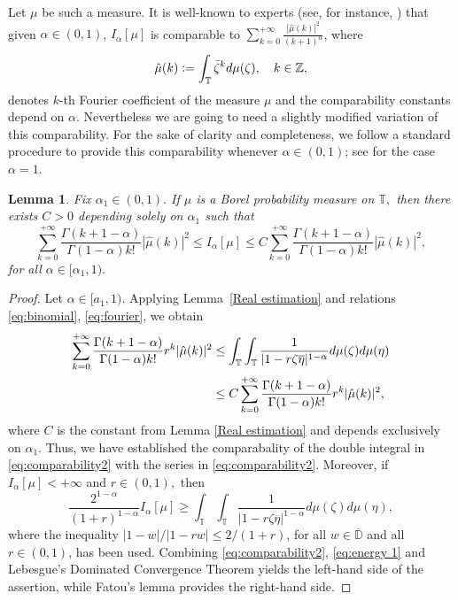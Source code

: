 \documentclass[12pt]{amsart}
\newtheorem{lemma}[theorem]{Lemma}
\theoremstyle{definition}\newtheorem{remark}[theorem]{Remark}
\theoremstyle{definition}\newtheorem{example}[theorem]{Example}
\theoremstyle{definition}\newtheorem{definition}{Definition}
\numberwithin{equation}{section}
\newcommand\DD{{\mathbb D}}
\newcommand\TT{{\mathbb T}}
\begin{document}
Let $\mu$ be such a measure. It is well-known to experts (see, for instance, \cite[p. 566]{EFKR}) that given $\alpha\in(0,1)$, $I_\alpha[\mu]$ is comparable to $\sum_{k=0}^{+\infty}\frac{|\hat{\mu}(k)|^2}{(k+1)^\alpha}$, where
\begin{equation}\label{eq:fourier}
    \hat{\mu}(k)\vcentcolon=\int_{\TT}{\bar{\zeta}}^kd\mu(\zeta), \quad k\in\mathbb{Z},
\end{equation}
denotes $k$-th Fourier coefficient of the measure $\mu$ and the comparability constants depend on $\alpha$. Nevertheless we are going to need a slightly modified variation of this comparability. For the sake of clarity and completeness, we follow a standard procedure to provide this comparability whenever $\alpha\in (0,1)$; see \cite[Theorem 2.4.4]{Primer} for the case $\alpha=1$.

\begin{lemma}\label{lem:energy}
Fix $\alpha_1\in(0,1).$ If $\mu$ is a Borel probability measure on $\TT,$ then there exists $C>0$ depending solely on $\alpha_1$ such that
\begin{equation*}
\sum_{k=0}^{+\infty}\frac{\Gamma(k+1-\alpha)}{\Gamma(1-\alpha)k!}|\hat{\mu}(k)|^2\leq I_\alpha[\mu]\leq C\sum_{k=0}^{+\infty}\frac{\Gamma(k+1-\alpha)}{\Gamma(1-\alpha)k!}|\hat{\mu}(k)|^2,
\end{equation*}
for all $\alpha\in [\alpha_1,1).$
\end{lemma}
\begin{proof}
Let $\alpha\in[a_1,1)$. Applying Lemma~\ref{Real estimation} and relations \eqref{eq:binomial}, \eqref{eq:fourier}, we obtain
\begin{align}\label{eq:comparability2}
\notag \sum_{k=0}^{+\infty}\frac{\Gamma(k+1-\alpha)}{\Gamma(1-\alpha)k!}r^k|\hat{\mu}(k)|^2&\leq \int_{\TT}\int_{\TT}\frac{1}{|1-r\zeta\overline{\eta}|^{1-\alpha}}d\mu(\zeta)d\mu(\eta)\\
&\leq  C\sum_{k=0}^{+\infty}\frac{\Gamma(k+1-\alpha)}{\Gamma(1-\alpha)k!}r^k|\hat{\mu}(k)|^2,
\end{align}
where $C$ is the constant from Lemma \ref{Real estimation} and depends exclusively on $\alpha_1$. Thus, we have established the comparabality of the double integral in \eqref{eq:comparability2} with the series in \eqref{eq:comparability2}. 
Moreover, if $I_\alpha[\mu]<+\infty$ and $r\in(0,1),$ then
\begin{equation}\label{eq:energy 1}
\frac{2^{1-\alpha}}{(1+r)^{1-\alpha}}I_\alpha[\mu]\geq
\int_{\TT}\int_{\TT}\frac{1}{|1-r\zeta\overline{\eta}|^{1-\alpha}}d\mu(\zeta)d\mu(\eta),
\end{equation}
where the inequality $|1-w|/|1-rw|\leq 2/(1+r)$, for all $w\in \overline{\DD}$ and all $r\in (0,1)$, has been used. Combining \eqref{eq:comparability2}, \eqref{eq:energy 1} and Lebesgue's Dominated Convergence Theorem yields the left-hand side of the assertion, while Fatou's lemma provides the right-hand side. 
\end{proof}
\end{document}
